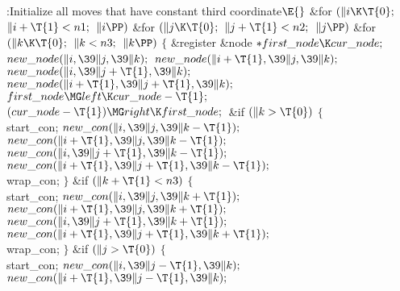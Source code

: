 \B{}:Initialize all moves that have constant third coordinate\X${}\E{}$\6
\&{for} ${}(\|i\K\T{0};{}$ ${}\|i+\T{1}<\\{n1};{}$ ${}\|i\PP){}$\1\6
\&{for} ${}(\|j\K\T{0};{}$ ${}\|j+\T{1}<\\{n2};{}$ ${}\|j\PP){}$\1\6
\&{for} ${}(\|k\K\T{0};{}$ ${}\|k<\\{n3};{}$ ${}\|k\PP){}$\5
${}\{{}$\1\6
\&{register} \&{node} ${}{*}\\{first\_node}\K\\{cur\_node};{}$\7
${}\\{new\_node}(\|i,\39\|j,\39\|k);{}$\6
${}\\{new\_node}(\|i+\T{1},\39\|j,\39\|k);{}$\6
${}\\{new\_node}(\|i,\39\|j+\T{1},\39\|k);{}$\6
${}\\{new\_node}(\|i+\T{1},\39\|j+\T{1},\39\|k);{}$\6
${}\\{first\_node}\MG\\{left}\K\\{cur\_node}-\T{1};{}$\6
${}(\\{cur\_node}-\T{1})\MG\\{right}\K\\{first\_node};{}$\6
\&{if} ${}(\|k>\T{0}){}$\5
${}\{{}$\1\6
\\{start\_con};\6
${}\\{new\_con}(\|i,\39\|j,\39\|k-\T{1});{}$\6
${}\\{new\_con}(\|i+\T{1},\39\|j,\39\|k-\T{1});{}$\6
${}\\{new\_con}(\|i,\39\|j+\T{1},\39\|k-\T{1});{}$\6
${}\\{new\_con}(\|i+\T{1},\39\|j+\T{1},\39\|k-\T{1});{}$\6
\\{wrap\_con};\6
\4${}\}{}$\2\6
\&{if} ${}(\|k+\T{1}<\\{n3}){}$\5
${}\{{}$\1\6
\\{start\_con};\6
${}\\{new\_con}(\|i,\39\|j,\39\|k+\T{1});{}$\6
${}\\{new\_con}(\|i+\T{1},\39\|j,\39\|k+\T{1});{}$\6
${}\\{new\_con}(\|i,\39\|j+\T{1},\39\|k+\T{1});{}$\6
${}\\{new\_con}(\|i+\T{1},\39\|j+\T{1},\39\|k+\T{1});{}$\6
\\{wrap\_con};\6
\4${}\}{}$\2\6
\&{if} ${}(\|j>\T{0}){}$\5
${}\{{}$\1\6
\\{start\_con};\6
${}\\{new\_con}(\|i,\39\|j-\T{1},\39\|k);{}$\6
${}\\{new\_con}(\|i+\T{1},\39\|j-\T{1},\39\|k);{}$\6
